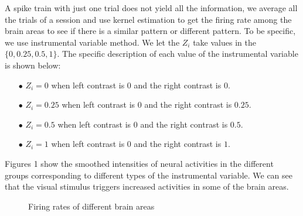 \documentclass[12pt]{article}
\begin{document}
A spike train with just one trial does not yield all the information, we average all the trials of a session and use kernel estimation to get the firing rate among the brain areas to see if there is a similar pattern or different pattern. To be specific, we use instrumental variable method. We let the $Z_{i}$ take values in the $\{0,0.25,0.5,1\}$. The specific description of each value of the instrumental variable is shown below:
\begin{itemize}
\item[$\bullet$] $Z_{i}=0$ when left contrast is $0$ and the right contrast is $0$.
\item[$\bullet$] $Z_{i}=0.25$ when left contrast is $0$ and the right contrast is $0.25$.
\item[$\bullet$] $Z_{i}=0.5$ when left contrast is $0$ and the right contrast is $0.5$.
\item[$\bullet$] $Z_{i}=1$ when left contrast is $0$ and the right contrast is $1$. 
\end{itemize}

Figures 1 show the smoothed intensities of neural activities in the different groups corresponding to different types of the instrumental variable. We can see that the visual stimulus triggers increased activities in some of the brain areas.

\begin{figure}[H]
  \centering
  \caption{Firing rates of different brain areas}
\end{figure}




\end{document}
